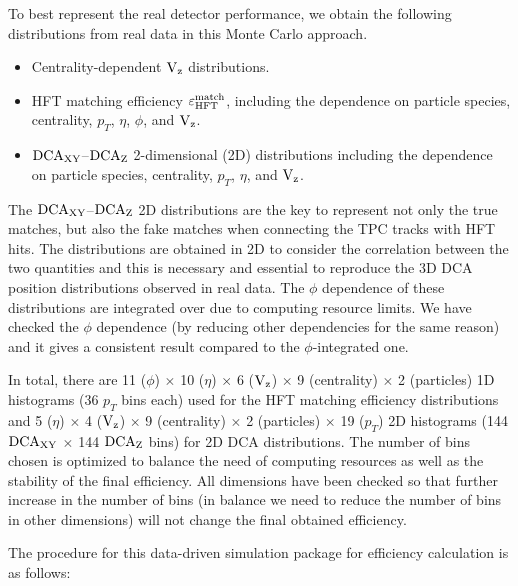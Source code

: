 \documentclass[%
 reprint,	
 amsmath,amssymb,
 aps,
 prc,
]{revtex4-1}
\begin{document}
To best represent the real detector performance, we obtain the following distributions from real data in this Monte Carlo approach.
\begin{itemize}
\item Centrality-dependent $\textup{V}_\textup{z}$ distributions.
\item HFT matching efficiency $\varepsilon_{\rm HFT}^{\rm match}$, including the dependence on particle species, centrality, $p_T$, $\eta$, $\phi$, and $\textup{V}_\textup{z}$.
\item $\textup{DCA}_{\textup{XY}}$--$\textup{DCA}_{\textup{Z}}$ 2-dimensional (2D) distributions including the dependence on particle species, centrality, $p_T$, $\eta$, and $\textup{V}_\textup{z}$.
\end{itemize}
The $\textup{DCA}_{\textup{XY}}$--$\textup{DCA}_{\textup{Z}}$ 2D distributions are the key to represent not only the true matches, but also the fake matches when connecting the TPC tracks with HFT hits. The distributions are obtained in 2D to consider the correlation between the two quantities and this is necessary and essential to reproduce the 3D DCA position distributions observed in real data. The $\phi$ dependence of these distributions are integrated over due to computing resource limits. We have checked the $\phi$ dependence (by reducing other dependencies for the same reason) and it gives a consistent result compared to the $\phi$-integrated one.

In total, there are 11 ($\phi$) $\times$ 10 ($\eta$) $\times$ 6 ($\textup{V}_\textup{z}$) $\times$ 9 (centrality) $\times$ 2 (particles) 1D histograms (36 $p_T$ bins each) used for the HFT matching efficiency distributions and 5 ($\eta$) $\times$ 4 ($\textup{V}_\textup{z}$) $\times$ 9 (centrality) $\times$ 2 (particles) $\times$ 19 ($p_T$) 2D histograms (144 $\textup{DCA}_{\textup{XY}}$ $\times$ 144 $\textup{DCA}_{\textup{Z}}$ bins) for 2D DCA distributions. The number of bins chosen is optimized to balance the need of computing resources as well as the stability of the final efficiency. All dimensions have been checked so that further increase in the number of bins (in balance we need to reduce the number of bins in other dimensions)  will not change the final obtained efficiency.

The procedure for this data-driven simulation package for efficiency calculation is as follows:
\end{document}
